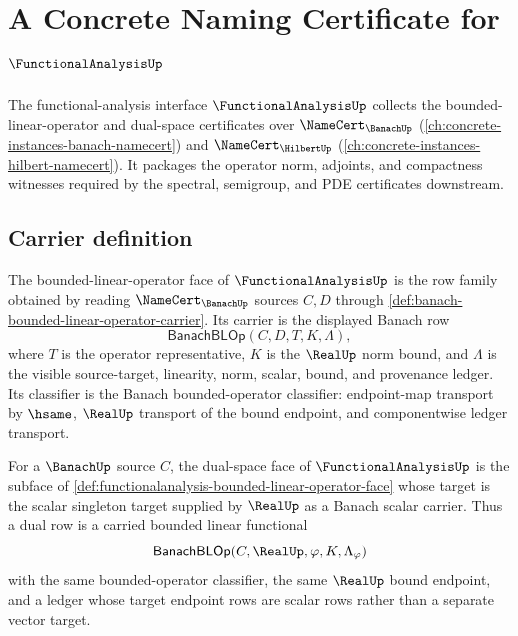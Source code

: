 \chapter{A Concrete Naming Certificate for $\FunctionalAnalysisUp$}
\label{ch:concrete-instances-functionalanalysis-namecert}

The functional-analysis interface $\FunctionalAnalysisUp$ collects the bounded-linear-operator and dual-space certificates over $\NameCert_{\BanachUp}$ (\autoref{ch:concrete-instances-banach-namecert}) and $\NameCert_{\HilbertUp}$ (\autoref{ch:concrete-instances-hilbert-namecert}). It packages the operator norm, adjoints, and compactness witnesses required by the spectral, semigroup, and PDE certificates downstream.

\section{Carrier definition}
\label{sec:functionalanalysis-carrier}

\begin{definition}
\label{def:functionalanalysis-bounded-linear-operator-face}
The bounded-linear-operator face of $\FunctionalAnalysisUp$ is the row family
obtained by reading $\NameCert_{\BanachUp}$ sources $C,D$ through
\autoref{def:banach-bounded-linear-operator-carrier}. Its carrier is the
displayed Banach row
$$
\mathsf{BanachBLOp}(C,D,T,K,\Lambda),
$$
where $T$ is the operator representative, $K$ is the $\RealUp$ norm bound, and
$\Lambda$ is the visible source-target, linearity, norm, scalar, bound, and
provenance ledger. Its classifier is the Banach bounded-operator classifier:
endpoint-map transport by $\hsame$, $\RealUp$ transport of the bound endpoint,
and componentwise ledger transport.
\end{definition}

\begin{definition}
\label{def:functionalanalysis-dual-space-face}
For a $\BanachUp$ source $C$, the dual-space face of $\FunctionalAnalysisUp$
is the subface of \autoref{def:functionalanalysis-bounded-linear-operator-face}
whose target is the scalar singleton target supplied by $\RealUp$ as a
Banach scalar carrier. Thus a dual row is a carried bounded linear functional
$$
\mathsf{BanachBLOp}(C,\RealUp,\varphi,K,\Lambda_\varphi)
$$
with the same bounded-operator classifier, the same $\RealUp$ bound endpoint,
and a ledger whose target endpoint rows are scalar rows rather than a
separate vector target.
\end{definition}

